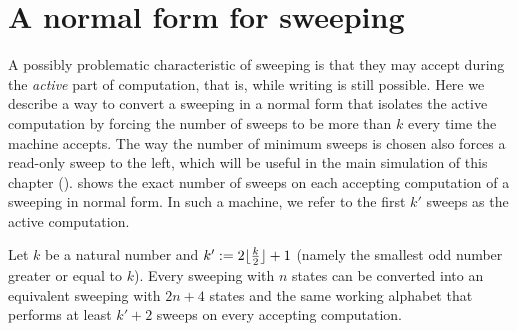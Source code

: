 \section{A normal form for sweeping \kDLAs}\label{sec:equiv-swep-dla}
A possibly problematic characteristic of sweeping \kDLAs is that they may accept during the \emph{active} part of computation, that is, while writing is still possible.
Here we describe a way to convert a sweeping \kDLA in a normal form that isolates the active computation by forcing the number of sweeps to be more than $k$ every time the machine accepts.
The way the number of minimum sweeps is chosen also forces a read-only sweep to the left, which will be useful in the main simulation of this chapter ().
 shows the exact number of sweeps on each accepting computation of a sweeping \kDLA in normal form.
In such a machine, we refer to the first $k'$ sweeps as the active computation.
\begin{thrm}\label{thm:equiv-swep-dla}
	Let $k$ be a natural number and $k':=2\lfloor \frac{k}{2} \rfloor+1$ (namely the smallest odd number greater or equal to $k$).
	Every sweeping \kDLA with $n$ states can be converted into an equivalent sweeping \kDLA with $2n+4$ states and the same working alphabet that performs at least $k'+2$ sweeps on every accepting computation.
\end{thrm}
